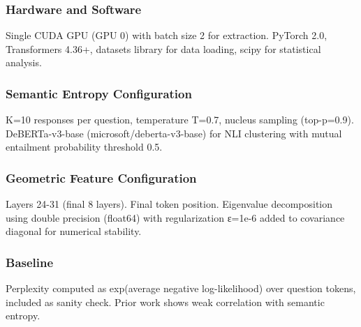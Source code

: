 
\subsubsection{Hardware and Software}

Single CUDA GPU (GPU 0) with batch size 2 for extraction. PyTorch 2.0, Transformers 4.36+, datasets library for data loading, scipy for statistical analysis.

\subsubsection{Semantic Entropy Configuration}

K=10 responses per question, temperature T=0.7, nucleus sampling (top-p=0.9). DeBERTa-v3-base (microsoft/deberta-v3-base) for NLI clustering with mutual entailment probability threshold 0.5.

\subsubsection{Geometric Feature Configuration}

Layers 24-31 (final 8 layers). Final token position. Eigenvalue decomposition using double precision (float64) with regularization ε=1e-6 added to covariance diagonal for numerical stability.

\subsubsection{Baseline}

Perplexity computed as exp(average negative log-likelihood) over question tokens, included as sanity check. Prior work shows weak correlation with semantic entropy.
